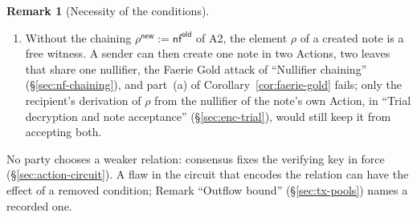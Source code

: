 \documentclass[11pt,a4paper]{article}
\theoremstyle{definition}
\newtheorem{remark}[theorem]{Remark}
\newcommand{\nfsym}{\mathsf{nf}}
\newcommand{\Pallas}{\ensuremath{\mathsf{Pallas}}}
\newcommand{\Vesta}{\ensuremath{\mathsf{Vesta}}}
\begin{document}
\begin{remark}[Necessity of the conditions]
\begin{enumerate}[label=(\roman*)]
  $M^{\mathsf{new}}$ by $\mathrm{LE}_{255}$, as $\rho$ and $\psi$ are. The
  congruence modulo $p_{\Vesta}$ that the binding signature certifies
  (Proposition~\ref{prop:bvk}) then no longer implies the equality of
  integers of Lemma~\ref{lem:modular-balance}. For a balancing value $x$
  with $0 < x < 2^{63}$, let a bundle have two Actions whose consumed notes
  are dummies of value $0$ and whose created notes have the values
  \[
    a := p_{\Pallas} - 1, \qquad b := p_{\Vesta} - p_{\Pallas} + 1 - x,
  \]
  both in $\{0, \dots, p_{\Pallas} - 1\}$, since $p_{\Vesta} - p_{\Pallas}
  > 2^{86}$ for the moduli of the protocol specification, \S``Pallas and
  Vesta''. The net values sum to $-(a + b) = x - p_{\Vesta}$, congruent to
  $x$ modulo $p_{\Vesta}$, so the net value commitments sum to a commitment
  to $x$, and the bundle may carry the balancing value $x$, which no
  consumed value funds: against R4. One Action does not suffice, since the
  created value $p_{\Vesta} - x$ that it would need exceeds
  $p_{\Pallas} - 1$.
\item Without the chaining $\rho^{\mathsf{new}} := \nfsym^{\mathsf{old}}$
  of A2, the element $\rho$ of a created note is a free witness. A sender can
  then create one note in two Actions, two leaves that share one nullifier,
  the Faerie Gold attack of ``Nullifier chaining'' (\S\ref{sec:nf-chaining}),
  and part~(a) of Corollary~\ref{cor:faerie-gold} fails; only the recipient's
  derivation of $\rho$ from the nullifier of the note's own Action, in
  ``Trial decryption and note acceptance'' (\S\ref{sec:enc-trial}), would
  still keep it from accepting both.
\end{enumerate}
No party chooses a weaker relation: consensus fixes the verifying key in
force (\S\ref{sec:action-circuit}). A flaw in the circuit that encodes the
relation can have the effect of a removed condition; Remark ``Outflow
bound'' (\S\ref{sec:tx-pools}) names a recorded one.
\end{remark}
\end{document}
